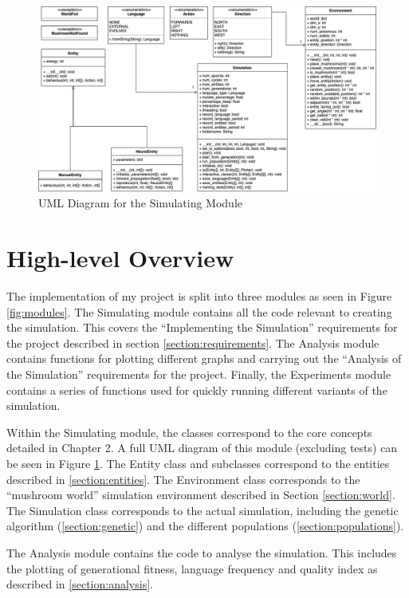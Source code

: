 \documentclass[12pt,a4paper,twoside,openright]{report}
\begin{document}
\begin{figure}[t]
  \centering
  \includegraphics[width=.9\linewidth]{figs/uml}
  \caption{UML Diagram for the Simulating Module}
  \label{fig:uml}
\end{figure}

\section{High-level Overview}

The implementation of my project is split into three modules as seen in Figure \ref{fig:modules}. The Simulating module contains all the code relevant to creating the simulation. This covers the ``Implementing the Simulation'' requirements for the project described in section \ref{section:requirements}. The Analysis module contains functions for plotting different graphs and carrying out the ``Analysis of the Simulation'' requirements for the project. Finally, the Experiments module contains a series of functions used for quickly running different variants of the simulation. 

Within the Simulating module, the classes correspond to the core concepts detailed in Chapter 2. A full UML diagram of this module (excluding tests) can be seen in Figure \ref{fig:uml}. The Entity class and subclasses correspond to the entities described in \ref{section:entities}. The Environment class corresponds to the ``mushroom world'' simulation environment described in Section \ref{section:world}. The Simulation class corresponds to the actual simulation, including the genetic algorithm (\ref{section:genetic}) and the different populations (\ref{section:populations}).

The Analysis module contains the code to analyse the simulation. This includes the plotting of generational fitness, language frequency and quality index as described in \ref{section:analysis}.
\end{document}
